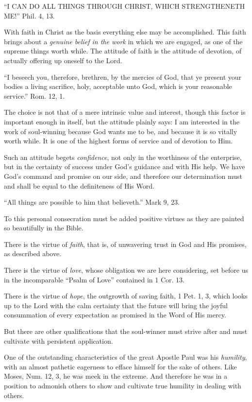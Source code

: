 \documentclass[
]{book}
\begin{document}
``I CAN DO ALL THINGS THROUGH CHRIST, WHICH STRENGTHENETH ME!'' Phil. 4, 13.

With faith in Christ as the basis everything else may be accomplished. This faith brings about a \emph{genuine belief in the work} in which we are engaged, as one of the supreme things worth while. The attitude of faith is the attitude of devotion, of actually offering up oneself to the Lord.

``I beseech you, therefore, brethren, by the mercies of God, that ye present your bodies a living sacrifice, holy, acceptable unto God, which is your reasonable service.'' Rom. 12, 1.

The choice is not that of a mere intrinsic value and interest, though this factor is important enough in itself, but the attitude plainly says: I am interested in the work of soul-winning because God wants me to be, and because it is so vitally worth while. It is one of the highest forms of service and of devotion to Him.

Such an attitude begets \emph{confidence}, not only in the worthiness of the enterprise, but in the certainty of success under God's guidance and with His help. We have God's command and promise on our side, and therefore our determination must and shall be equal to the definiteness of His Word.

``All things are possible to him that believeth.'' Mark 9, 23.

To this personal consecration must be added positive virtues as they are painted so beautifully in the Bible.

There is the virtue of \emph{faith}, that is, of unwavering trust in God and His promises, as described above.

There is the virtue of \emph{love}, whose obligation we are here considering, set before us in the incomparable ``Psalm of Love'' contained in 1 Cor. 13.

There is the virtue of \emph{hope}, the outgrowth of saving faith, 1 Pet. 1, 3, which looks up to the Lord with the calm certainty that the future will bring the joyful consummation of every expectation as promised in the Word of His mercy.

But there are other qualifications that the soul-winner must strive after and must cultivate with persistent application.

One of the outstanding characteristics of the great Apostle Paul was his \emph{humility}, with an almost pathetic eagerness to efface himself for the sake of others. Like Moses, Num. 12, 3, he was meek in the extreme. And therefore he was in a position to admonish others to show and cultivate true humility in dealing with others.
\end{document}
